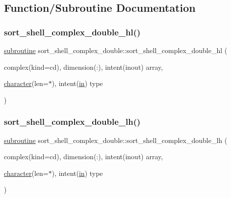 \subsection{Function/\+Subroutine Documentation}
\mbox{\label{M__sort_8f90_a941eb553497ce355c8c650912f609751}} 
\subsubsection{\texorpdfstring{sort\+\_\+shell\+\_\+complex\+\_\+double\+\_\+hl()}{sort\_shell\_complex\_double\_hl()}}
{\footnotesize\ttfamily \hyperlink{M__stopwatch_83_8txt_acfbcff50169d691ff02d4a123ed70482}{subroutine} sort\+\_\+shell\+\_\+complex\+\_\+double\+::sort\+\_\+shell\+\_\+complex\+\_\+double\+\_\+hl (\begin{DoxyParamCaption}\item[{complex(kind=cd), dimension(\+:), intent(inout)}]{array,  }\item[{\hyperlink{option__stopwatch_83_8txt_abd4b21fbbd175834027b5224bfe97e66}{character}(len=$\ast$), intent(\hyperlink{M__journal_83_8txt_afce72651d1eed785a2132bee863b2f38}{in})}]{type }\end{DoxyParamCaption})\hspace{0.3cm}{\ttfamily [private]}}

\mbox{\label{M__sort_8f90_a2910d11c802e6658c33f26b2300a7f90}} 
\subsubsection{\texorpdfstring{sort\+\_\+shell\+\_\+complex\+\_\+double\+\_\+lh()}{sort\_shell\_complex\_double\_lh()}}
{\footnotesize\ttfamily \hyperlink{M__stopwatch_83_8txt_acfbcff50169d691ff02d4a123ed70482}{subroutine} sort\+\_\+shell\+\_\+complex\+\_\+double\+::sort\+\_\+shell\+\_\+complex\+\_\+double\+\_\+lh (\begin{DoxyParamCaption}\item[{complex(kind=cd), dimension(\+:), intent(inout)}]{array,  }\item[{\hyperlink{option__stopwatch_83_8txt_abd4b21fbbd175834027b5224bfe97e66}{character}(len=$\ast$), intent(\hyperlink{M__journal_83_8txt_afce72651d1eed785a2132bee863b2f38}{in})}]{type }\end{DoxyParamCaption})\hspace{0.3cm}{\ttfamily [private]}}

